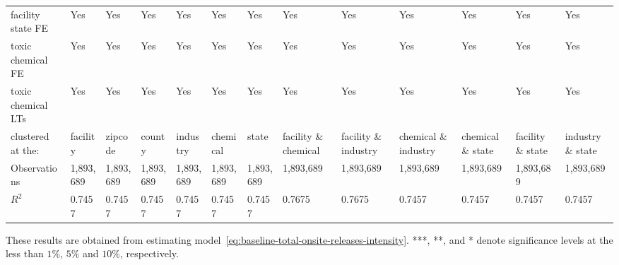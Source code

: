 \begin{table}[H]
{\begin{tabular}{@{}lllllllllllll@{}}
            facility state FE              & Yes       & Yes       & Yes       & Yes       & Yes       & Yes       & Yes                  & Yes                  & Yes                  & Yes               & Yes               & Yes               \\
            toxic chemical FE              & Yes       & Yes       & Yes       & Yes       & Yes       & Yes       & Yes                  & Yes                  & Yes                  & Yes               & Yes               & Yes               \\
            toxic chemical LTs             & Yes       & Yes       & Yes       & Yes       & Yes       & Yes       & Yes                  & Yes                  & Yes                  & Yes               & Yes               & Yes               \\ \midrule \midrule
            clustered at the:              & facility  & zipcode   & county    & industry  & chemical  & state     & facility \& chemical & facility \& industry & chemical \& industry & chemical \& state & facility \& state & industry \& state \\
            Observations                   & 1,893,689 & 1,893,689 & 1,893,689 & 1,893,689 & 1,893,689 & 1,893,689 & 1,893,689            & 1,893,689            & 1,893,689            & 1,893,689         & 1,893,689         & 1,893,689         \\
            $R^2$                          & 0.7457    & 0.7457    & 0.7457    & 0.7457    & 0.7457    & 0.7457    & 0.7675               & 0.7675               & 0.7457               & 0.7457            & 0.7457            & 0.7457            \\ \bottomrule \bottomrule
        \end{tabular}%
    }
    \begin{minipage}{18cm}
        \vspace{0.05in}
        These results are obtained from estimating model~\ref{eq:baseline-total-onsite-releases-intensity}. ***, **, and * denote significance levels at the less than $1\%$, $5\%$ and $10\%$, respectively.
    \end{minipage}
\end{table}